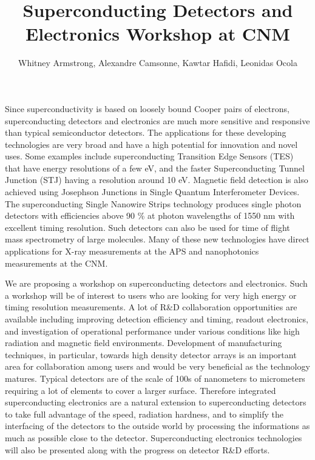 \documentclass[12pt]{article}
\title{Superconducting Detectors and Electronics Workshop at CNM}
\author{Whitney Armstrong, Alexandre Camsonne, Kawtar Hafidi, Leonidas Ocola}
\begin{document}
\maketitle

Since superconductivity is based on loosely bound Cooper pairs of electrons, 
superconducting detectors and electronics are much more sensitive and 
responsive than typical semiconductor detectors. The applications for these 
developing technologies are very broad and have a high potential for 
innovation and novel uses. Some examples include superconducting Transition Edge 
Sensors (TES) that have energy resolutions of a few eV, and the faster 
Superconducting Tunnel Junction (STJ) having a resolution around 10 eV. 
Magnetic field detection is also achieved using Josephson Junctions in Single 
Quantum Interferometer Devices. The superconducting Single Nanowire Strips 
technology produces single photon detectors with efficiencies above 90 \% at 
photon wavelengths of 1550 nm with excellent timing resolution.  Such detectors 
can also be used for time of flight mass spectrometry of large molecules.  Many 
of these new technologies have direct applications for X-ray measurements at 
the APS and nanophotonics measurements at the CNM.

We are proposing a workshop on superconducting detectors and electronics.
Such a workshop will be of interest to users who are looking for very high 
energy or timing resolution measurements. A lot of R\&D collaboration 
opportunities are available including improving detection efficiency and timing, 
readout electronics, and investigation of operational performance under 
various conditions like high radiation and magnetic field environments.
Development of manufacturing techniques, in particular, towards high density 
detector arrays is an important area for collaboration among users and would 
be very beneficial as the technology matures. Typical detectors are of 
the scale of 100s of nanometers to micrometers requiring a lot of elements to cover 
a larger surface. Therefore integrated superconducting electronics are a natural 
extension to superconducting detectors to take full advantage of the speed, 
radiation hardness, and to simplify the interfacing of the detectors to the outside 
world by processing the informations as much as possible close to the 
detector. Superconducting electronics technologies will also be presented along 
with the progress on detector R\&D efforts.

\vspace{2cm}
\end{document}
